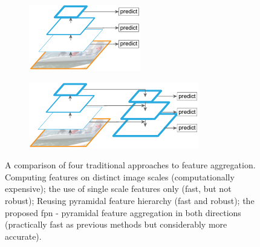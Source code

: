 \begin{figure}
    \begin{subfigure}[t]{0.4\textwidth}
        \centering
        \includegraphics[width=\textwidth]{figures/theoretical_foundations/fpn_pyramidal_feature_hierarchy.pdf}
        \caption[]{}
    \end{subfigure}
    \hfill
    \begin{subfigure}[t]{0.4\textwidth}
        \centering
        \includegraphics[width=\textwidth]{figures/theoretical_foundations/fpn_feature_pyramid_network.pdf}
        \caption[]{}
    \end{subfigure}
    \caption[\gls{fpn}]{A comparison of four traditional approaches to feature aggregation.  Computing features on distinct image scales (computationally expensive);  the use of single scale features only (fast, but not robust);  Reusing pyramidal feature hierarchy (fast and robust);  the proposed \gls{fpn} - pyramidal feature aggregation in both directions (practically fast as previous methods but considerably more accurate). }
    \label{fig:FPNVariousApproaches}
\end{figure}

